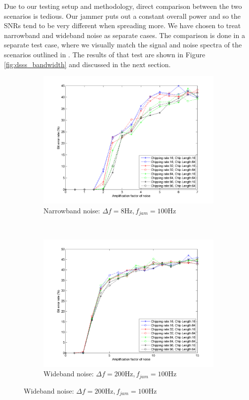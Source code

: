 			Due to our testing setup and methodology, direct comparison between the two scenarios is tedious.
			Our jammer puts out a constant overall power and so the SNRs tend to be very different when spreading more.
			We have chosen to treat narrowband and wideband noise as separate cases.
			The comparison is done in a separate test case, where we visually match the signal and noise spectra of the scenarios outlined in \cite{ISS}.
			The results of that test are shown in Figure \ref{fig:dsss_bandwidth} and discussed in the next section.
				\begin{figure}[H]
					\centering
				    \begin{subfigure}[b]{0.5\textwidth}
						\includegraphics[width=\textwidth]{imgs/results/plot_mode_dsss-test_narrowband-rep_20-dataRate_8-dataLength_128.png}
						\caption{Narrowband noise: $\Delta f= 8 \text{Hz}, f_{jam} = 100\text{Hz}$}
						\label{fig:dsss_narrowband}
					\end{subfigure}%
					~
					\begin{subfigure}[b]{0.5\textwidth}
						\includegraphics[width=\textwidth]{imgs/results/plot_mode_dsss-test_wideband-rep_20-dataRate_8-dataLength_128.png}
						\caption{Wideband noise: $\Delta f = 200 \text{Hz}, f_{jam} = 100\text{Hz}$}
						\label{fig:dsss_wideband}
					\end{subfigure}
				\end{figure}
				
